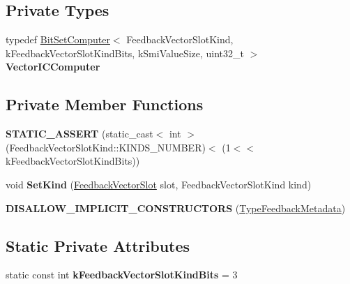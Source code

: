 \subsection*{Private Types}
\begin{DoxyCompactItemize}
\item 
typedef \hyperlink{classv8_1_1internal_1_1_bit_set_computer}{Bit\+Set\+Computer}$<$ Feedback\+Vector\+Slot\+Kind, k\+Feedback\+Vector\+Slot\+Kind\+Bits, k\+Smi\+Value\+Size, uint32\+\_\+t $>$ {\bfseries Vector\+I\+C\+Computer}\hypertarget{classv8_1_1internal_1_1_type_feedback_metadata_a7599378c748db01866ba5da01c0cd1fb}{}\label{classv8_1_1internal_1_1_type_feedback_metadata_a7599378c748db01866ba5da01c0cd1fb}

\end{DoxyCompactItemize}
\subsection*{Private Member Functions}
\begin{DoxyCompactItemize}
\item 
{\bfseries S\+T\+A\+T\+I\+C\+\_\+\+A\+S\+S\+E\+RT} (static\+\_\+cast$<$ int $>$(Feedback\+Vector\+Slot\+Kind\+::\+K\+I\+N\+D\+S\+\_\+\+N\+U\+M\+B\+ER)$<$ (1$<$$<$ k\+Feedback\+Vector\+Slot\+Kind\+Bits))\hypertarget{classv8_1_1internal_1_1_type_feedback_metadata_ade1cdb54942ba76a893fe8575d8f0947}{}\label{classv8_1_1internal_1_1_type_feedback_metadata_ade1cdb54942ba76a893fe8575d8f0947}

\item 
void {\bfseries Set\+Kind} (\hyperlink{classv8_1_1internal_1_1_feedback_vector_slot}{Feedback\+Vector\+Slot} slot, Feedback\+Vector\+Slot\+Kind kind)\hypertarget{classv8_1_1internal_1_1_type_feedback_metadata_af1c650ed49405501bcad11ad6e2832b7}{}\label{classv8_1_1internal_1_1_type_feedback_metadata_af1c650ed49405501bcad11ad6e2832b7}

\item 
{\bfseries D\+I\+S\+A\+L\+L\+O\+W\+\_\+\+I\+M\+P\+L\+I\+C\+I\+T\+\_\+\+C\+O\+N\+S\+T\+R\+U\+C\+T\+O\+RS} (\hyperlink{classv8_1_1internal_1_1_type_feedback_metadata}{Type\+Feedback\+Metadata})\hypertarget{classv8_1_1internal_1_1_type_feedback_metadata_ab6cc3f13bfd9bd8f76c97e4c4802ebf7}{}\label{classv8_1_1internal_1_1_type_feedback_metadata_ab6cc3f13bfd9bd8f76c97e4c4802ebf7}

\end{DoxyCompactItemize}
\subsection*{Static Private Attributes}
\begin{DoxyCompactItemize}
\item 
static const int {\bfseries k\+Feedback\+Vector\+Slot\+Kind\+Bits} = 3\hypertarget{classv8_1_1internal_1_1_type_feedback_metadata_ab9963039bef02fcc0c8385f758e9a1d4}{}\label{classv8_1_1internal_1_1_type_feedback_metadata_ab9963039bef02fcc0c8385f758e9a1d4}

\end{DoxyCompactItemize}
